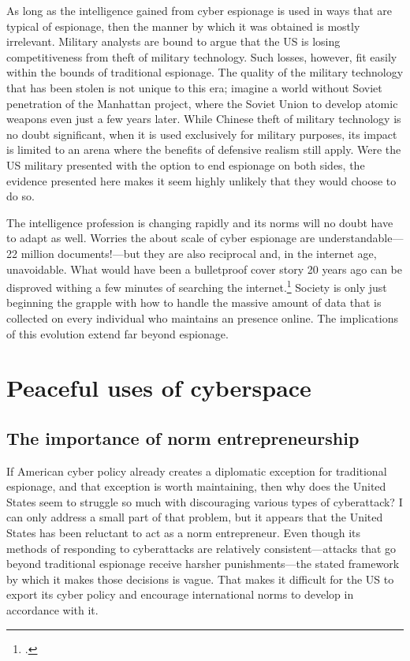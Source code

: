 \documentclass[11pt]{memoir}
\begin{document}
As long as the intelligence gained from cyber espionage is used in ways that are typical of espionage, then the manner by which it was obtained is mostly irrelevant. Military analysts are bound to argue that the US is losing competitiveness from theft of military technology. Such losses, however, fit easily within the bounds of traditional espionage. The quality of the military technology that has been stolen is not unique to this era; imagine a world without Soviet penetration of the Manhattan project, where the Soviet Union to develop atomic weapons even just a few years later. While Chinese theft of military technology is no doubt significant, when it is used exclusively for military purposes, its impact is limited to an arena where the benefits of defensive realism still apply. Were the US military presented with the option to end espionage on both sides, the evidence presented here makes it seem highly unlikely that they would choose to do so.

The intelligence profession is changing rapidly and its norms will no doubt have to adapt as well. Worries the about scale of cyber espionage are understandable---22 million documents!---but they are also reciprocal and, in the internet age, unavoidable. What would have been a bulletproof cover story 20 years ago can be disproved withing a few minutes of searching the internet.\footcite{lucas_spycraft_2019} Society is only just beginning the grapple with how to handle the massive amount of data that is collected on every individual who maintains an presence online. The implications of this evolution extend far beyond espionage.

\section{Peaceful uses of cyberspace}
\subsection{The importance of norm entrepreneurship}
If American cyber policy already creates a diplomatic exception for traditional espionage, and that exception is worth maintaining, then why does the United States seem to struggle so much with discouraging various types of cyberattack? I can only address a small part of that problem, but it appears that the United States has been reluctant to act as a norm entrepreneur. Even though its methods of responding to cyberattacks are relatively consistent---attacks that go beyond traditional espionage receive harsher punishments---the stated framework by which it makes those decisions is vague. That makes it difficult for the US to export its cyber policy and encourage international norms to develop in accordance with it.
\end{document}
